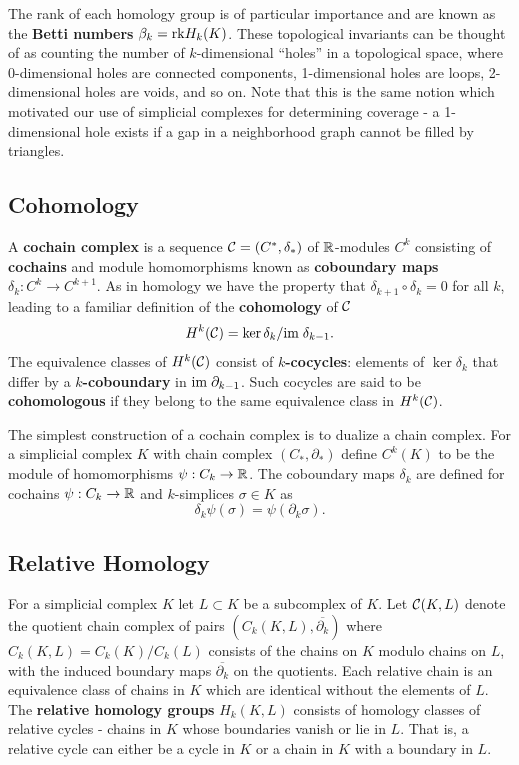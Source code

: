 The rank of each homology group is of particular importance and are known as the \textbf{Betti numbers} $\beta_k = \mathrm{rk} H_k(K)$.
These topological invariants can be thought of as counting the number of $k$-dimensional ``holes'' in a topological space, where 0-dimensional holes are connected components, 1-dimensional holes are loops, 2-dimensional holes are voids, and so on.
Note that this is the same notion which motivated our use of simplicial complexes for determining coverage - a 1-dimensional hole exists if a gap in a neighborhood graph cannot be filled by triangles.

\subsection{Cohomology}

A \textbf{cochain complex} is a sequence $\mathcal{C} = (C^*, \delta_*)$ of $\mathbb{R}$-modules $C^k$ consisting of \textbf{cochains} and module homomorphisms known as \textbf{coboundary maps} $\delta_k:C^k\to C^{k+1}$.
As in homology we have the property that $\delta_{k+1}\circ\delta_k = 0$ for all $k$, leading to a familiar definition of the \textbf{cohomology} of $\mathcal{C}$
\[ H^k(\mathcal{C}) = \ker\delta_k/\mathrm{im}\;\delta_{k-1}.\]
The equivalence classes of $H^k(\mathcal{C})$ consist of \textbf{$k$-cocycles}: elements of $\ker\delta_k$ that differ by a \textbf{$k$-coboundary} in $\mathrm{im}\;\partial_{k-1}$.
Such cocycles are said to be \textbf{cohomologous} if they belong to the same equivalence class in $H^k(\mathcal{C})$.

The simplest construction of a cochain complex is to dualize a chain complex.
For a simplicial complex $K$ with chain complex $(C_*,\partial_*)$ define $C^k(K)$ to be the module of homomorphisms $\psi:C_k\to\mathbb{R}$.
The coboundary maps $\delta_k$ are defined for cochains $\psi:C_k\to\mathbb{R}$ and $k$-simplices $\sigma\in K$ as
\[\delta_k\psi(\sigma) = \psi(\partial_k\sigma).\]

\subsection{Relative Homology}

For a simplicial complex $K$ let $L\subset K$ be a subcomplex of $K$.
Let $\mathcal{C}(K, L)$ denote the quotient chain complex of pairs $(C_k(K, L), \overline{\partial_k})$ where $C_k(K, L) = C_k(K)/C_k(L)$ consists of the chains on $K$ modulo chains on $L$, with the induced boundary maps $\overline{\partial_k}$ on the quotients.
Each relative chain is an equivalence class of chains in $K$ which are identical without the elements of $L$.
The \textbf{relative homology groups} $H_k(K, L)$ consists of homology classes of relative cycles - chains in $K$ whose boundaries vanish or lie in $L$.
That is, a relative cycle can either be a cycle in $K$ or a chain in $K$ with a boundary in $L$.

